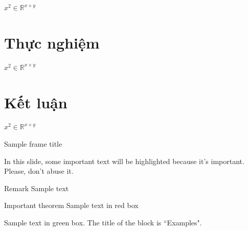 \documentclass[10pt,mathserif]{beamer}
\begin{document}
\begin{frame}
	
	$x^{2} \in \mathbb{R}^{x \times y}$
\end{frame}

\section{Thực nghiệm}

\begin{frame}
	
	$x^{2} \in \mathbb{R}^{x \times y}$
\end{frame}

\section{Kết luận}

\begin{frame}
	
	$x^{2} \in \mathbb{R}^{x \times y}$
\end{frame}

\begin{frame}[label=frame]{Sample frame title}
	
	In this slide, some important text will be
	\alert{highlighted} because it's important.
	Please, don't abuse it.
	
	\begin{block}{Remark}
		Sample text
	\end{block}
	
	\begin{alertblock}{Important theorem}
		Sample text in red box
	\end{alertblock}
	
	\begin{examples}
		Sample text in green box. The title of the block is ``Examples".
	\end{examples}
	\hyperlink{appendix}{}
\end{frame}
\end{document}
